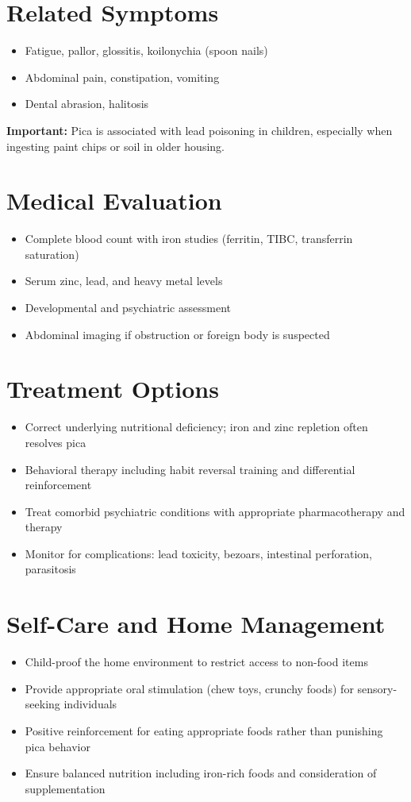 \section*{Related Symptoms}
\begin{itemize}
  \item Fatigue, pallor, glossitis, koilonychia (spoon nails)
  \item Abdominal pain, constipation, vomiting
  \item Dental abrasion, halitosis
\end{itemize}
\textbf{Important:} Pica is associated with lead poisoning in children, especially when ingesting paint chips or soil in older housing.

\section*{Medical Evaluation}
\begin{itemize}
  \item Complete blood count with iron studies (ferritin, TIBC, transferrin saturation)
  \item Serum zinc, lead, and heavy metal levels
  \item Developmental and psychiatric assessment
  \item Abdominal imaging if obstruction or foreign body is suspected
\end{itemize}

\section*{Treatment Options}
\begin{itemize}
  \item Correct underlying nutritional deficiency; iron and zinc repletion often resolves pica
  \item Behavioral therapy including habit reversal training and differential reinforcement
  \item Treat comorbid psychiatric conditions with appropriate pharmacotherapy and therapy
  \item Monitor for complications: lead toxicity, bezoars, intestinal perforation, parasitosis
\end{itemize}

\section*{Self-Care and Home Management}
\begin{itemize}
  \item Child-proof the home environment to restrict access to non-food items
  \item Provide appropriate oral stimulation (chew toys, crunchy foods) for sensory-seeking individuals
  \item Positive reinforcement for eating appropriate foods rather than punishing pica behavior
  \item Ensure balanced nutrition including iron-rich foods and consideration of supplementation
\end{itemize}

